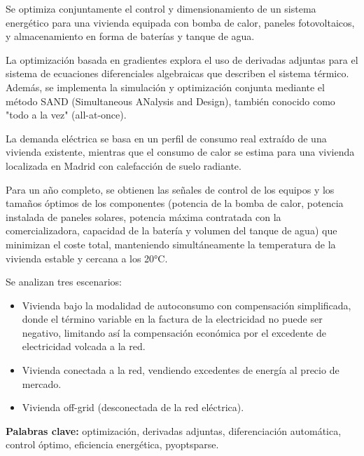 Se optimiza conjuntamente el control y dimensionamiento de un sistema
energético para una vivienda equipada con bomba de calor, paneles
fotovoltaicos, y almacenamiento en forma de baterías y tanque de agua.

La optimización basada en gradientes explora el uso de derivadas adjuntas para
el sistema de ecuaciones diferenciales algebraicas que describen el sistema
térmico. Además, se implementa la simulación y optimización conjunta mediante
el método SAND (Simultaneous ANalysis and Design), también conocido como "todo
a la vez" (all-at-once).

La demanda eléctrica se basa en un perfil de consumo real extraído de una
vivienda existente, mientras que el consumo de calor se estima para una
vivienda localizada en Madrid con calefacción de suelo radiante.

Para un año completo, se obtienen las señales de control de los equipos y los
tamaños óptimos de los componentes (potencia de la bomba de calor, potencia
instalada de paneles solares, potencia máxima contratada con la
comercializadora, capacidad de la batería y volumen del tanque de agua) que
minimizan el coste total, manteniendo simultáneamente la temperatura de la
vivienda estable y cercana a los 20°C.

Se analizan tres escenarios:

\begin{itemize}
	\item Vivienda bajo la modalidad de autoconsumo con compensación
	      simplificada, donde el término variable en la factura de la electricidad no
	      puede ser negativo, limitando así la compensación económica por el excedente de
	      electricidad volcada a la red.
	\item Vivienda conectada a la red, vendiendo excedentes de energía al precio de
	      mercado.
	\item Vivienda off-grid (desconectada de la red eléctrica).
\end{itemize}

\begin{flushleft} \textbf{Palabras clave:} optimización, derivadas adjuntas,
	diferenciación automática, control óptimo, eficiencia energética, pyoptsparse.
\end{flushleft}
